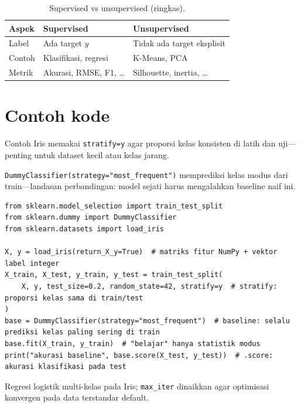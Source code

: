 \documentclass[../main.tex]{subfiles}
\begin{document}


\begin{table}[htbp]
\centering
\caption{Supervised vs unsupervised (ringkas).}
\label{tab:sup-unsup}
\begin{tabular}{@{}p{3.2cm}p{4.8cm}p{4.8cm}@{}}
\toprule
\textbf{Aspek} & \textbf{Supervised} & \textbf{Unsupervised} \\
\midrule
Label & Ada target $y$ & Tidak ada target eksplisit \\
Contoh & Klasifikasi, regresi & K-Means, PCA \\
Metrik & Akurasi, RMSE, F1, \ldots & Silhouette, inertia, \ldots \\
\bottomrule
\end{tabular}
\end{table}

\section{Contoh kode}

Contoh Iris memakai \texttt{stratify=y} agar proporsi kelas konsisten di latih dan uji---penting untuk dataset kecil atau kelas jarang.

\MulaiPenjelasanKode \texttt{DummyClassifier(strategy="most\_frequent")} memprediksi kelas modus dari train---landasan perbandingan: model sejati harus mengalahkan baseline naif ini. \SelesaiPenjelasanKode

\begin{lstlisting}[caption=Split dan baseline DummyClassifier]
from sklearn.model_selection import train_test_split
from sklearn.dummy import DummyClassifier
from sklearn.datasets import load_iris

X, y = load_iris(return_X_y=True)  # matriks fitur NumPy + vektor label integer
X_train, X_test, y_train, y_test = train_test_split(
    X, y, test_size=0.2, random_state=42, stratify=y  # stratify: proporsi kelas sama di train/test
)
base = DummyClassifier(strategy="most_frequent")  # baseline: selalu prediksi kelas paling sering di train
base.fit(X_train, y_train)  # "belajar" hanya statistik modus
print("akurasi baseline", base.score(X_test, y_test))  # .score: akurasi klasifikasi pada test
\end{lstlisting}

\MulaiPenjelasanKode Regresi logistik multi-kelas pada Iris; \texttt{max\_iter} dinaikkan agar optimisasi konvergen pada data terstandar default. \SelesaiPenjelasanKode
\end{document}
